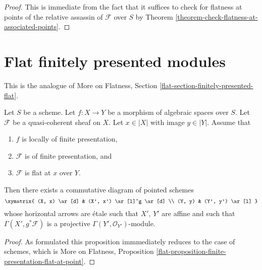 \begin{proof}
This is immediate from the fact that it suffices to check for
flatness at points of the relative assassin of $\mathcal{F}$
over $S$ by
Theorem \ref{theorem-check-flatness-at-associated-points}.
\end{proof}




\section{Flat finitely presented modules}
\label{section-finitely-presented-flat}

\noindent
This is the analogue of More on Flatness, Section
\ref{flat-section-finitely-presented-flat}.

\begin{proposition}
\label{proposition-finite-presentation-flat-at-point}
Let $S$ be a scheme.
Let $f : X \to Y$ be a morphism of algebraic spaces over $S$.
Let $\mathcal{F}$ be a quasi-coherent sheaf on $X$.
Let $x \in |X|$ with image $y \in |Y|$.
Assume that
\begin{enumerate}
\item $f$ is locally of finite presentation,
\item $\mathcal{F}$ is of finite presentation, and
\item $\mathcal{F}$ is flat at $x$ over $Y$.
\end{enumerate}
Then there exists a commutative diagram of pointed schemes
$$
\xymatrix{
(X, x) \ar[d] & (X', x') \ar[l]^g \ar[d] \\
(Y, y) & (Y', y') \ar[l]
}
$$
whose horizontal arrows are \'etale such that $X'$, $Y'$
are affine and such that
$\Gamma(X', g^*\mathcal{F})$ is a projective
$\Gamma(Y', \mathcal{O}_{Y'})$-module.
\end{proposition}

\begin{proof}
As formulated this proposition immmediately reduces
to the case of schemes, which is
More on Flatness, Proposition
\ref{flat-proposition-finite-presentation-flat-at-point}.
\end{proof}

